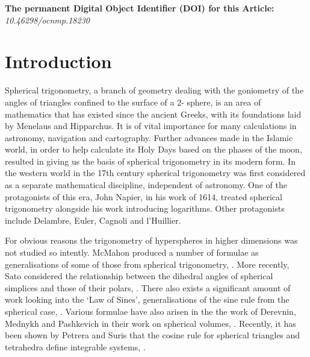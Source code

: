 \documentclass[fleqn,11pt,twoside]{article}
\theoremstyle{definition}
\begin{document}
\strut\hfill

\noindent
{\bf The permanent Digital Object Identifier (DOI) for this Article:}\newline
{\it 10.46298/ocnmp.18230}
\strut\hfill


\begin{abstract}

\noindent 
We develop the basic formulae of hyperspherical trigonometry in multidimensional Euclidean space, using multidimensional vector products, and their conversion to identities for elliptic functions. We show that the basic addition formulae for functions on the 3-sphere embedded in 4-dimensional space lead to addition formulae for elliptic functions, associated with algebraic curves, which have two distinct moduli. We give an application of these formulae to the cases of a multidimensional Euler top, using them to provide a link to the Double Elliptic model.

\end{abstract}

\label{firstpage}



\section{Introduction}

Spherical trigonometry, a branch of geometry dealing with the goniometry of the angles of triangles confined to the surface of a 2-
sphere, is an area of mathematics that has existed since the ancient Greeks, with its foundations laid by Menelaus and Hipparchus. It 
is of vital importance for many calculations in astronomy, navigation and cartography. Further advances made in the Islamic world, in 
order to help calculate its Holy Days based on the phases of the moon, resulted in giving us the basis of spherical trigonometry in its 
modern form. In the western world in the 17th century spherical trigonometry was first considered as a separate mathematical 
discipline, independent of astronomy. One of the protagonists of this era, John Napier, in his work of 1614, treated spherical 
trigonometry alongside his work introducing logarithms. Other protagonists include Delambre, Euler, Cagnoli and l'Huillier.

For obvious reasons the trigonometry of hyperspheres in higher dimensions was not studied so intently. McMahon produced a number of 
formulae as generalisations of some of those from spherical trigonometry, \cite{2}. More recently, Sato considered the relationship 
between the dihedral angles of spherical simplices and those of their polars, \cite{sato}. There also exists a significant amount of work 
looking into the `Law of Sines', generalisations of the sine rule from the spherical case, \cite{eriksson}. Various formulae have also 
arisen in the the work of Derevnin, Mednykh and Pashkevich in their work on spherical volumes, \cite{Derevnin,Derevnin2}.  Recently, it 
has been shown by Petrera and Suris that the cosine rule for spherical triangles and tetrahedra define integrable systems, \cite{Suris}. 
\end{document}
